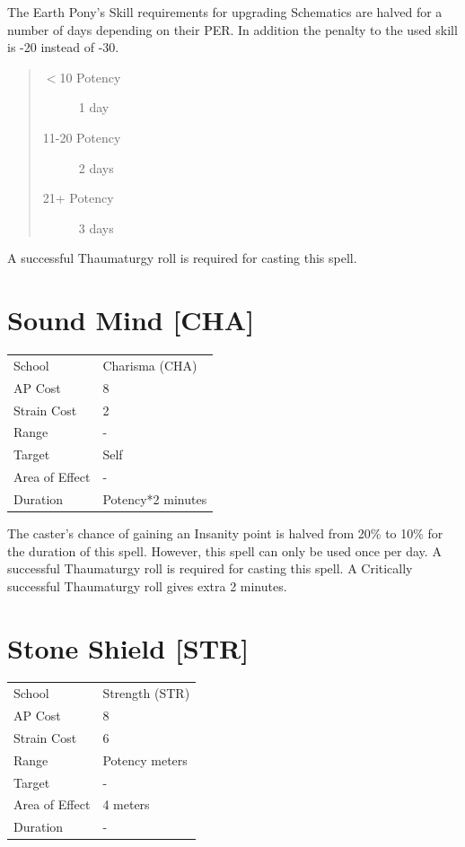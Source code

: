 \documentclass[11pt,a4paper,twocolumn]{book}
\begin{document}
\medskip

The Earth Pony's Skill requirements for upgrading Schematics are halved for a number of days depending on their PER. In addition the penalty to the used skill is -20 instead of -30.

\begin{quote}
  \begin{description}
    \item[$<$10 Potency] 	1 day
    \item[11-20 Potency] 	2 days
    \item[21+ Potency] 	3 days
  \end{description}	
\end{quote}

A successful Thaumaturgy roll is required for casting this spell.


\section*{Sound Mind [CHA]}
{
	\begin{tabu} to 75mm{| X[l,4] | X[l,7] |}
		\hline
		School 			& Charisma (CHA) 	\\
        AP Cost	      	& 8 				\\
        Strain Cost     & 2 				\\
        Range     		& - 				\\
        Target      	& Self 				\\
        Area of Effect  & - 	 			\\
        Duration     	& Potency*2 minutes \\ \hline
	\end{tabu}
		
}

\medskip

The caster's chance of gaining an Insanity point is halved from 20\% to 10\% for the duration of this spell. However, this spell can only be used once per day. A successful Thaumaturgy roll is required for casting this spell. A Critically successful Thaumaturgy roll gives extra 2 minutes.


\section*{Stone Shield [STR]}
{
	\begin{tabu} to 75mm{| X[l,4] | X[l,7] |}
		\hline
		School 			& Strength (STR) 	\\
        AP Cost	      	& 8 				\\
        Strain Cost     & 6 				\\
        Range     		& Potency meters 	\\
        Target      	& - 				\\
        Area of Effect  & 4 meters 	 		\\
        Duration     	& - 				\\ \hline
	\end{tabu}
		
}
\end{document}
